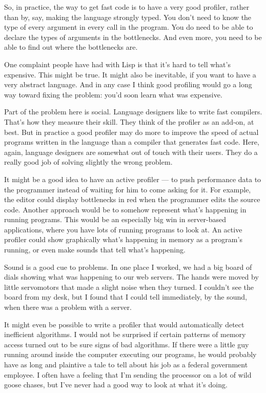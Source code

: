 So, in practice, the way to get fast code is to have a very good
profiler, rather than by, say, making the language strongly typed. You
don't need to know the type of every argument in every call in the
program. You do need to be able to declare the types of arguments in the
bottlenecks. And even more, you need to be able to find out where the
bottlenecks are.

One complaint people have had with Lisp is that it's hard to tell what's
expensive. This might be true. It might also be inevitable, if you want
to have a very abstract language. And in any case I think good profiling
would go a long way toward fixing the problem: you'd soon learn what was
expensive.

Part of the problem here is social. Language designers like to write
fast compilers. That's how they measure their skill. They think of the
profiler as an add-on, at best. But in practice a good profiler may do
more to improve the speed of actual programs written in the language
than a compiler that generates fast code. Here, again, language
designers are somewhat out of touch with their users. They do a really
good job of solving slightly the wrong problem.

It might be a good idea to have an active profiler --- to push
performance data to the programmer instead of waiting for him to come
asking for it. For example, the editor could display bottlenecks in red
when the programmer edits the source code. Another approach would be to
somehow represent what's happening in running programs. This would be an
especially big win in server-based applications, where you have lots of
running programs to look at. An active profiler could show graphically
what's happening in memory as a program's running, or even make sounds
that tell what's happening.

Sound is a good cue to problems. In one place I worked, we had a big
board of dials showing what was happening to our web servers. The hands
were moved by little servomotors that made a slight noise when they
turned. I couldn't see the board from my desk, but I found that I could
tell immediately, by the sound, when there was a problem with a server.

It might even be possible to write a profiler that would automatically
detect inefficient algorithms. I would not be surprised if certain
patterns of memory access turned out to be sure signs of bad algorithms.
If there were a little guy running around inside the computer executing
our programs, he would probably have as long and plaintive a tale to
tell about his job as a federal government employee. I often have a
feeling that I'm sending the processor on a lot of wild goose chases,
but I've never had a good way to look at what it's doing.

